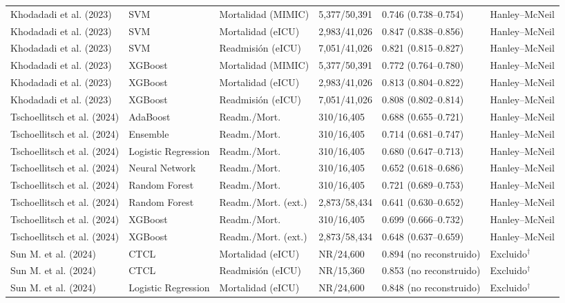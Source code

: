 \begin{table}[H]
\begin{adjustbox}{max width=\textwidth}
\begin{tabular}{llllll}
    Khodadadi et al. (2023) & SVM & Mortalidad (MIMIC) & 5,377/50,391 & 0.746 (0.738--0.754) & Hanley--McNeil \\
    Khodadadi et al. (2023) & SVM & Mortalidad (eICU) & 2,983/41,026 & 0.847 (0.838--0.856) & Hanley--McNeil \\
    Khodadadi et al. (2023) & SVM & Readmisión (eICU) & 7,051/41,026 & 0.821 (0.815--0.827) & Hanley--McNeil \\
    Khodadadi et al. (2023) & XGBoost & Mortalidad (MIMIC) & 5,377/50,391 & 0.772 (0.764--0.780) & Hanley--McNeil \\
    Khodadadi et al. (2023) & XGBoost & Mortalidad (eICU) & 2,983/41,026 & 0.813 (0.804--0.822) & Hanley--McNeil \\
    Khodadadi et al. (2023) & XGBoost & Readmisión (eICU) & 7,051/41,026 & 0.808 (0.802--0.814) & Hanley--McNeil \\
    Tschoellitsch et al. (2024) & AdaBoost & Readm./Mort. & 310/16,405 & 0.688 (0.655--0.721) & Hanley--McNeil \\
    Tschoellitsch et al. (2024) & Ensemble & Readm./Mort. & 310/16,405 & 0.714 (0.681--0.747) & Hanley--McNeil \\
    Tschoellitsch et al. (2024) & Logistic Regression & Readm./Mort. & 310/16,405 & 0.680 (0.647--0.713) & Hanley--McNeil \\
    Tschoellitsch et al. (2024) & Neural Network & Readm./Mort. & 310/16,405 & 0.652 (0.618--0.686) & Hanley--McNeil \\
    Tschoellitsch et al. (2024) & Random Forest & Readm./Mort. & 310/16,405 & 0.721 (0.689--0.753) & Hanley--McNeil \\
    Tschoellitsch et al. (2024) & Random Forest & Readm./Mort. (ext.) & 2,873/58,434 & 0.641 (0.630--0.652) & Hanley--McNeil \\
    Tschoellitsch et al. (2024) & XGBoost & Readm./Mort. & 310/16,405 & 0.699 (0.666--0.732) & Hanley--McNeil \\
    Tschoellitsch et al. (2024) & XGBoost & Readm./Mort. (ext.) & 2,873/58,434 & 0.648 (0.637--0.659) & Hanley--McNeil \\
    Sun M. et al. (2024) & CTCL & Mortalidad (eICU) & NR/24,600 & 0.894 (no reconstruido) & Excluido$^\dagger$ \\
    Sun M. et al. (2024) & CTCL & Readmisión (eICU) & NR/15,360 & 0.853 (no reconstruido) & Excluido$^\dagger$ \\
    Sun M. et al. (2024) & Logistic Regression & Mortalidad (eICU) & NR/24,600 & 0.848 (no reconstruido) & Excluido$^\dagger$ \\

\end{tabular}
\end{adjustbox}
\end{table}
